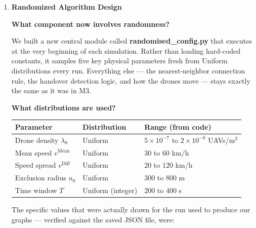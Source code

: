 \documentclass[11pt]{article}
\newcommand{\subquestion}[1]{
    \vspace{0.3cm}
    \noindent\textbf{#1}
    \vspace{0.1cm}
}
\begin{document}
\begin{enumerate}[label=\textbf{Scribe Question \arabic*:}, leftmargin=*, itemsep=1.5em]
\subquestion{Why introduce randomization?}

Running everything at one fixed set of values only tells us the theory holds for that single scenario.
In practice, drone networks look different every time they're deployed --- the number of drones, their
speeds, and the distances involved all vary. When we instead draw parameters randomly each run,
every simulation becomes its own independent test. If the theoretical predictions still hold up across
all of those varied runs, we can be confident the results genuinely generalize rather than being a
coincidence of one carefully chosen configuration.

\newpage
\item \textbf{Randomized Algorithm Design}

\subquestion{What component now involves randomness?}

We built a new central module called \textbf{randomised\_config.py} that executes at the very
beginning of each simulation. Rather than loading hard-coded constants, it samples five key physical
parameters fresh from Uniform distributions every run. Everything else --- the nearest-neighbor
connection rule, the handover detection logic, and how the drones move --- stays exactly the same
as it was in M3.

\subquestion{What distributions are used?}

\vspace{0.3cm}
\begin{center}
\begin{tabular}{lll}
    \toprule
    \textbf{Parameter} & \textbf{Distribution} & \textbf{Range (from code)} \\
    \midrule
    Drone density $\lambda_0$ & Uniform & $5\times10^{-7}$ to $2\times10^{-6}$ UAVs/m$^2$ \\
    Mean speed $v^{\text{Mean}}$ & Uniform & $30$ to $60$ km/h \\
    Speed spread $v^{\text{Diff}}$ & Uniform & $20$ to $120$ km/h \\
    Exclusion radius $u_0$ & Uniform & $300$ to $800$ m \\
    Time window $T$ & Uniform (integer) & $200$ to $400$ s \\
    \bottomrule
\end{tabular}
\end{center}
\vspace{0.3cm}

The specific values that were actually drawn for the run used to produce our graphs ---
verified against the saved JSON file, were:


\end{enumerate}
\end{document}
